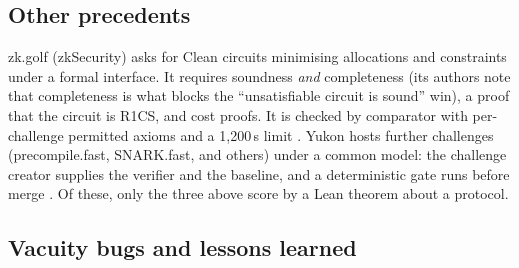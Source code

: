 \subsection{Other precedents}\label{subsec:prior-other}

zk.golf (zkSecurity) asks for Clean circuits minimising allocations and constraints under a formal
interface. It requires soundness \emph{and} completeness (its authors note that completeness is
what blocks the ``unsatisfiable circuit is sound'' win), a proof that the circuit is R1CS, and
cost proofs. It is checked by comparator with per-challenge permitted axioms and a 1{,}200\,s limit
\cite{dellimmagine2026zkgolf}. Yukon hosts further challenges (precompile.fast, SNARK.fast, and
others) under a common model: the challenge creator supplies the verifier and the baseline, and a
deterministic gate runs before merge \cite{yukon2026}. Of these, only the three above score by a
Lean theorem about a protocol.

\subsection{Vacuity bugs and lessons learned}\label{subsec:prior-lessons}

